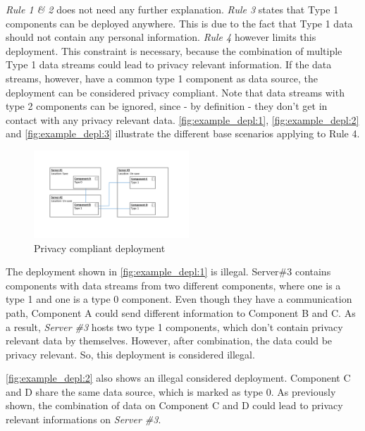 \textit{Rule 1 \& 2} does not need any further explanation. \textit{Rule 3} states that Type 1 components can be deployed anywhere. This is due to the fact that Type 1 data should not contain any personal information. \textit{Rule 4} however limits this deployment. This constraint is necessary, because the combination of multiple Type 1 data streams could lead to privacy relevant information. If the data streams, however, have a common type 1 component as data source, the deployment can be considered privacy compliant. Note that data streams with type 2 components can be ignored, since - by definition - they don't get in contact with any privacy relevant data. \autoref{fig:example_depl:1}, \autoref{fig:example_depl:2} and \autoref{fig:example_depl:3} illustrate the different base scenarios applying to Rule 4. 

	
\begin{figure}
	\begin{center}
		\includegraphics[trim = 35mm 45mm 40mm 35mm, clip, width=0.52\textwidth]{graphs/deployment_example_3}
	\end{center}
	\caption{Privacy compliant deployment}
	\label{fig:example_depl:3}
\end{figure}

The deployment shown in \autoref{fig:example_depl:1} is illegal. Server\#3 contains components with data streams from two different components, where one is a type 1 and one is a type 0 component. Even though they have a communication path, Component A could send different information to Component B and C. As a result, \textit{Server \#3} hosts two type 1 components, which don't contain privacy relevant data by themselves. However, after combination, the data could be privacy relevant. So, this deployment is considered illegal.

\autoref{fig:example_depl:2} also shows an illegal considered deployment. Component C and D share the same data source, which is marked as type 0. As previously shown, the combination of data on Component C and D could lead to privacy relevant informations on \textit{Server \#3}.

